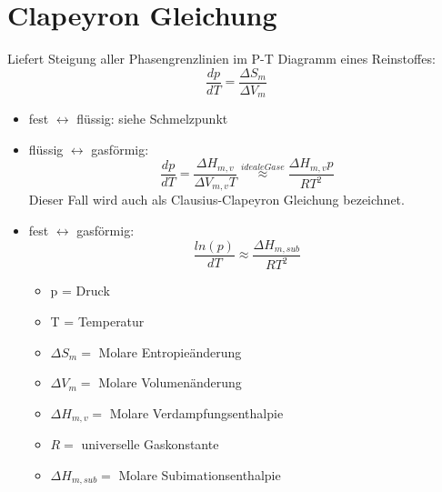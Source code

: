 \documentclass[10pt,a4paper]{article}
\begin{document}
\section{Clapeyron Gleichung}
Liefert Steigung aller Phasengrenzlinien im P-T Diagramm eines Reinstoffes:
\begin{equation}
\frac{dp}{dT}=\frac{\Delta S_m}{\Delta V_m}
\end{equation}
\begin{itemize}
\item fest $\leftrightarrow$ flüssig: siehe Schmelzpunkt
\item flüssig $\leftrightarrow$ gasförmig: 
\begin{equation}
\frac{dp}{dT}=\frac{\Delta H_{m,v}}{\Delta V_{m,v}T}\stackrel{ideale Gase}{\approx}\frac{\Delta H_{m,v}p}{RT^2}
\end{equation}
Dieser Fall wird auch als Clausius-Clapeyron Gleichung bezeichnet.
\item fest $\leftrightarrow$ gasförmig: 
\begin{equation}
\frac{ln(p)}{dT} \approx \frac{\Delta H_{m,sub}}{RT^2}
\end{equation}
\begin{itemize}
\item p = Druck
\item T = Temperatur
\item $\Delta S_m=$ Molare Entropieänderung
\item $\Delta V_m=$ Molare Volumenänderung
\item $\Delta H_{m,v}=$ Molare Verdampfungsenthalpie
\item $R=$ universelle Gaskonstante
\item $\Delta H_{m,sub}=$ Molare Subimationsenthalpie
\end{itemize}
\end{itemize}
\end{document}
